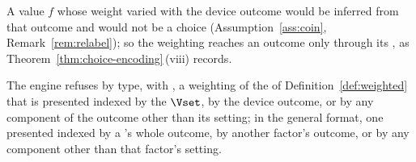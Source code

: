 
A value $f$ whose weight varied with the device outcome would be inferred from
that outcome and would not be a choice (Assumption~\ref{ass:coin},
Remark~\ref{rem:relabel}); so the weighting reaches an outcome only through
its , as Theorem~\ref{thm:choice-encoding}\,(viii) records.

\begin{requirement}\label{req:setting-only-weighting}
The engine refuses by type, with , a
weighting of the  of
Definition~\ref{def:weighted} that is presented indexed by the  $\Vset$, by the device outcome, or by any component of the outcome
other than its setting; in the general format, one presented indexed by a
's whole outcome, by another factor's outcome, or by any
component other than that factor's setting.
\end{requirement}
